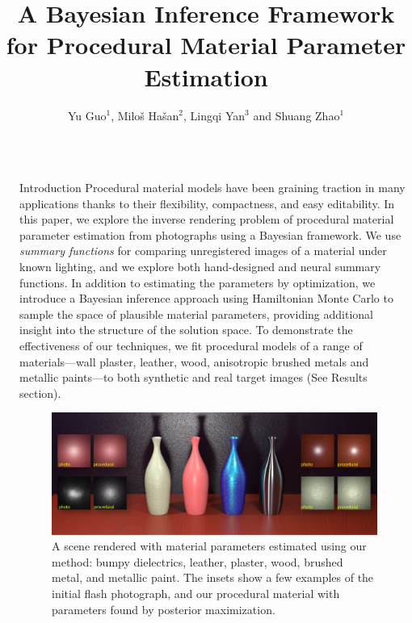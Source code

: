 \documentclass[final]{beamer}
\title{A Bayesian Inference Framework for Procedural Material Parameter Estimation} %
\author{Yu Guo$^1$, Milo\v{s} Ha\v{s}an$^2$, Lingqi Yan$^3$ and Shuang Zhao$^1$} %
\institute{$^1$University of California, Irvine \hspace{2cm}
$^2$Adobe Research \hspace{2cm}
$^3$University of California, Santa Barbara
\vspace{1cm}
} %
\newlength{\sepwid}
\newlength{\twocolwid}
\begin{document}
\begin{frame}[t] %
\vspace{-1.5cm}
\begin{columns}[t] %
    \begin{column}{\sepwid}\end{column} %
    \begin{column}{\twocolwid} %
        \begin{block}{Introduction}
            \large{
                Procedural material models have been graining traction in many applications thanks to their flexibility, compactness, and easy editability.
                In this paper, we explore the inverse rendering problem of procedural material parameter estimation from photographs using a Bayesian framework.
                We use \emph{summary functions} for comparing unregistered images of a material under known lighting, and we explore both hand-designed and neural summary functions. In addition to estimating the parameters by optimization, we introduce a Bayesian inference approach using Hamiltonian Monte Carlo to sample the space of plausible material parameters, providing additional insight into the structure of the solution space.
                To demonstrate the effectiveness of our techniques, we fit procedural models of a range of materials---wall plaster, leather, wood, anisotropic brushed metals and metallic paints---to both synthetic and real target images (See Results section).
                \vspace{1cm}
            }
            
            \begin{figure}
                \includegraphics[width=0.9\linewidth]{other/teaser.jpg}
             	\caption{\label{fig:teaser}
             		A scene rendered with material parameters estimated using our method: bumpy dielectrics, leather, plaster, wood, brushed metal, and metallic paint. The insets show a few examples of the initial flash photograph, and our procedural material with parameters found by posterior maximization.}
             \end{figure}
    

\end{block}
\end{column}
\end{columns}
\end{frame}
\end{document}
